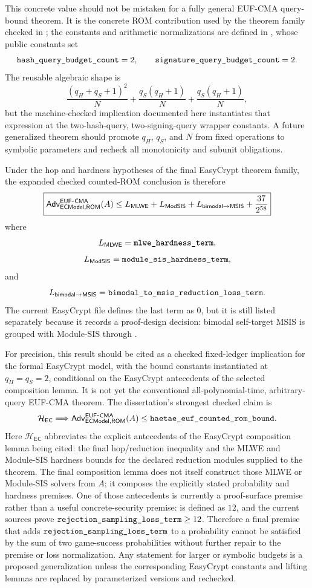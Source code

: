 This concrete value should not be mistaken for a fully general EUF-CMA
query-bound theorem.  It is the concrete ROM contribution used by the theorem
family checked in ; the constants and arithmetic
normalizations are defined in , whose public constants set
\[
  \texttt{hash\_query\_budget\_count}=2,
  \qquad
  \texttt{signature\_query\_budget\_count}=2.
\]
The reusable algebraic shape is
\[
  \frac{(q_H+q_S+1)^2}{N}
  +
  \frac{q_S(q_H+1)}{N}
  +
  \frac{q_S(q_H+1)}{N},
\]
but the machine-checked implication documented here instantiates that expression at
the two-hash-query, two-signing-query wrapper constants.  A future generalized theorem
should promote \(q_H\), \(q_S\), and \(N\) from fixed operations to symbolic
parameters and recheck all monotonicity and subunit obligations.

Under the hop and hardness hypotheses of the final EasyCrypt theorem family, the
expanded checked counted-ROM conclusion is therefore
\[
\boxed{
  \mathsf{Adv}_{\mathsf{ECModel},\mathsf{ROM}}^{\mathsf{EUF}\mbox{-}\mathsf{CMA}}(A)
  \le
  L_{\mathsf{MLWE}}
  + L_{\mathsf{ModSIS}}
  + L_{\mathsf{bimodal}\to\mathsf{MSIS}}
  + \frac{37}{2^{58}}
}
\]
where
\[
  L_{\mathsf{MLWE}}=\texttt{mlwe\_hardness\_term},
\]
\[
  L_{\mathsf{ModSIS}}=\texttt{module\_sis\_hardness\_term},
\]
and
\[
  L_{\mathsf{bimodal}\to\mathsf{MSIS}}
  =\texttt{bimodal\_to\_msis\_reduction\_loss\_term}.
\]
The current EasyCrypt file defines the last term as \(0\), but it is still
listed separately because it records a proof-design decision: bimodal
self-target MSIS is grouped with Module-SIS through
.

For precision, this result should be cited as a checked fixed-ledger implication
for the formal EasyCrypt model, with the bound constants instantiated at
\(q_H=q_S=2\), conditional on the EasyCrypt antecedents of the selected
composition lemma.  It is not yet the conventional
all-polynomial-time, arbitrary-query EUF-CMA theorem.  The dissertation's
strongest checked claim is
\[
  \mathcal{H}_{\mathsf{EC}}
  \Longrightarrow
  \mathsf{Adv}_{\mathsf{ECModel},\mathsf{ROM}}^{\mathsf{EUF}\mbox{-}\mathsf{CMA}}(A)
  \le
  \texttt{haetae\_euf\_counted\_rom\_bound}.
\]
Here \(\mathcal{H}_{\mathsf{EC}}\) abbreviates the explicit antecedents of the
EasyCrypt composition lemma being cited: the final hop/reduction inequality and
the MLWE and Module-SIS hardness bounds for the declared reduction modules
supplied to the theorem.  The final composition lemma does not itself construct
those MLWE or Module-SIS solvers from \(A\); it composes the explicitly stated
probability and hardness premises.
One of those antecedents is currently a proof-surface premise rather than a
useful concrete-security premise:  is
defined as \(12\), and the current sources prove
\(\texttt{rejection\_sampling\_loss\_term}\ge 12\).  Therefore a final premise that
adds \(\texttt{rejection\_sampling\_loss\_term}\) to a probability cannot be
satisfied by the sum of two game-success probabilities without further repair to
the premise or loss normalization.
Any statement for larger or symbolic budgets is a proposed generalization unless
the corresponding EasyCrypt constants and lifting lemmas are replaced by
parameterized versions and rechecked.


